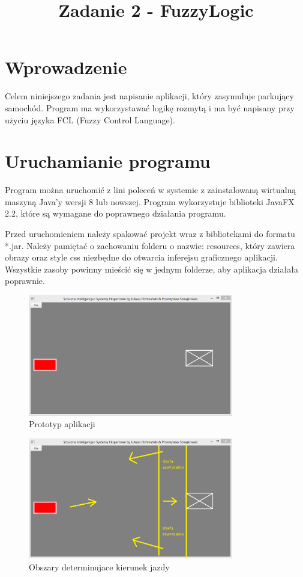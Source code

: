 \documentclass{classrep}
\author{
  \studentinfo{Łukasz Ochmański}{183566} \and
  \studentinfo{Przemysław Szwajkowski}{173524}
}
\title{Zadanie 2 - FuzzyLogic}
\begin{document}
\maketitle


\section{Wprowadzenie}
Celem niniejszego zadania jest napisanie aplikacji, który zasymuluje parkujący samochód. Program ma wykorzystawać logikę rozmytą i ma być napisany przy użyciu języka FCL (Fuzzy Control Language).

\section{Uruchamianie programu}
Program można uruchomić z lini poleceń w systemie z zainstalowaną wirtualną maszyną Java'y wersji 8 lub nowszej. Program wykorzystuje biblioteki JavaFX 2.2, które są wymagane do poprawnego działania programu.

Przed uruchomieniem należy spakować projekt wraz z bibliotekami do formatu *.jar. Należy pamiętać o zachowaniu folderu o nazwie: resources, który zawiera obrazy oraz style css niezbędne do otwarcia inferejsu graficznego aplikacji. Wszystkie zasoby powinny mieścić się w jednym folderze, aby aplikacja działała poprawnie.

\begin{figure}[ht]
\centering
	\includegraphics[width=0.8\textwidth,natwidth=610,natheight=642]{pictures/Obraz01.png}
	\caption{Prototyp aplikacji}
	\label{fig:Prototyp aplikacji}
\end{figure}

\begin{figure}[ht]
\centering
	\includegraphics[width=0.8\textwidth,natwidth=610,natheight=642]{pictures/Obraz13.png}
	\caption{Obszary determinujace kierunek jazdy}
	\label{fig:Obszary determinujace kierunek jazdy}
\end{figure}
\end{document}
